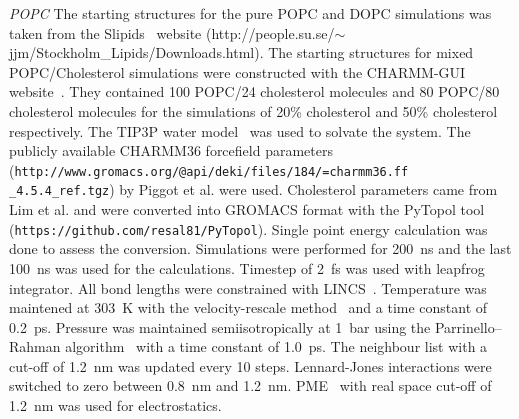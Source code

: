 \documentclass[pre,aps,floatfix,authordate1-4,twocolumn]{revtex4-1}
\begin{document}
{\it POPC}
The starting structures for the pure POPC and DOPC simulations was taken from the Slipids~\cite{jambeck12b} website (http://people.su.se/$\sim$jjm/Stockholm\_Lipids/Downloads.html).
The starting structures for mixed POPC/Cholesterol simulations were constructed with the CHARMM-GUI website~\cite{jo08}. 
They contained 100 POPC/24 cholesterol molecules and 80 POPC/80 cholesterol molecules for
the simulations of 20\% cholesterol and 50\% cholesterol respectively. The TIP3P water model~\cite{jorgensen83} was used to
solvate the system.
The publicly available CHARMM36 forcefield parameters (\texttt{http://www.gromacs.org/@api/deki/files/184/=charmm36.ff\\\_4.5.4\_ref.tgz}) 
by Piggot et al. \cite{piggot12} were used. Cholesterol parameters came
from Lim et al. \cite{lim12} and were converted into GROMACS format with the PyTopol tool (\texttt{https://github.com/resal81/PyTopol}).  
Single point energy calculation was done to assess the conversion. 
Simulations were performed for 200~ns and the last 100~ns was used for the calculations. Timestep of 2~fs was
used with leapfrog integrator. All bond lengths were constrained with LINCS~\cite{hess97,hess07}. Temperature was maintened at
303~K with the velocity-rescale method~\cite{bussi07} and a time constant of 0.2~ps. Pressure was maintained semiisotropically
at 1~bar using the Parrinello--Rahman algorithm~\cite{parrinello81} with a time constant of 1.0~ps. The neighbour list with a cut-off of 1.2~nm
was updated every 10 steps. Lennard-Jones interactions were switched to zero
between 0.8~nm and 1.2~nm. PME~\cite{darden93,essman95} with real space cut-off of 1.2~nm was used for electrostatics.
\end{document}
